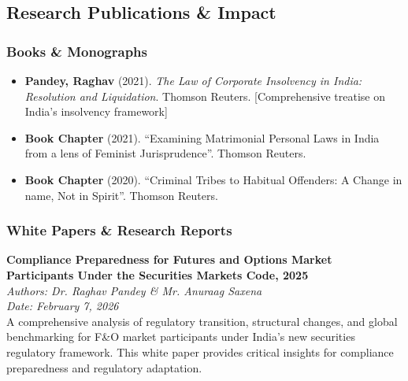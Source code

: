 \documentclass[11pt,a4paper]{article}
\begin{document}
\vspace{0.5cm}

\subsection*{Research Publications \& Impact}

\subsubsection*{Books \& Monographs}

\begin{itemize}[leftmargin=*,itemsep=0.2cm]
    \item \textbf{Pandey, Raghav} (2021). \textit{The Law of Corporate Insolvency in India: Resolution and Liquidation}. Thomson Reuters. [Comprehensive treatise on India's insolvency framework]

    \item \textbf{Book Chapter} (2021). ``Examining Matrimonial Personal Laws in India from a lens of Feminist Jurisprudence''. Thomson Reuters.

    \item \textbf{Book Chapter} (2020). ``Criminal Tribes to Habitual Offenders: A Change in name, Not in Spirit''. Thomson Reuters.
\end{itemize}

\vspace{0.5cm}

\subsubsection*{White Papers \& Research Reports}

\begin{tcolorbox}[colback=goldthread!15,colframe=goldthread,title={\textbf{Featured Research}},fonttitle=\bfseries]
\textbf{Compliance Preparedness for Futures and Options Market Participants Under the Securities Markets Code, 2025}\\[0.2cm]
\textit{Authors: Dr. Raghav Pandey \& Mr. Anuraag Saxena}\\
\textit{Date: February 7, 2026}\\[0.3cm]
A comprehensive analysis of regulatory transition, structural changes, and global benchmarking for F\&O market participants under India's new securities regulatory framework. This white paper provides critical insights for compliance preparedness and regulatory adaptation.
\end{tcolorbox}
\end{document}
